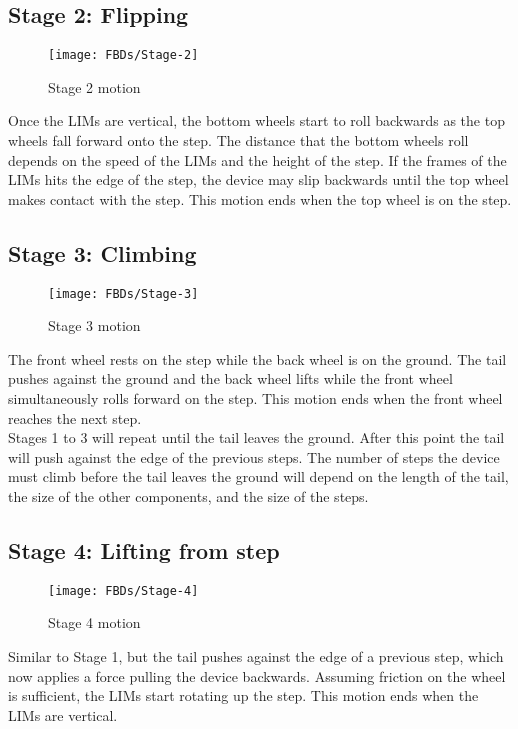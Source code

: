 \subsection*{Stage 2: Flipping}
\begin{wrapfigure}{r}{0.35\textwidth} %
	\centering
	\texttt{[image: FBDs/Stage-2]}
	\caption{Stage 2 motion}
	\label{fig:stage2}
\end{wrapfigure}
Once the LIMs are vertical, the bottom wheels start to roll backwards as the top wheels fall forward onto the step. The distance that the bottom wheels roll depends on the speed of the LIMs and the height of the step. If the frames of the LIMs hits the edge of the step, the device may slip backwards until the top wheel makes contact with the step. This motion ends when the top wheel is on the step.\\

\subsection*{Stage 3: Climbing}
\begin{wrapfigure}{r}{0.35\textwidth} %
	\centering
	\texttt{[image: FBDs/Stage-3]}
	\caption{Stage 3 motion}
	\label{fig:stage3}
\end{wrapfigure}
The front wheel rests on the step while the back wheel is on the ground. The tail pushes against the ground and the back wheel lifts while the front wheel simultaneously rolls forward on the step. This motion ends when the front wheel reaches the next step.\\

Stages 1 to 3 will repeat until the tail leaves the ground. After this point the tail will push against the edge of the previous steps. The number of steps the device must climb before the tail leaves the ground will depend on the length of the tail, the size of the other components, and the size of the steps. 

\subsection*{Stage 4: Lifting from step}
\begin{wrapfigure}{r}{0.35\textwidth} %
	\centering
	\texttt{[image: FBDs/Stage-4]}
	\caption{Stage 4 motion}
	\label{fig:stage4}
\end{wrapfigure}
Similar to Stage 1, but the tail pushes against the edge of a previous step, which now applies a force pulling the device backwards. Assuming friction on the wheel is sufficient, the LIMs start rotating up the step. This motion ends when the LIMs are vertical.

